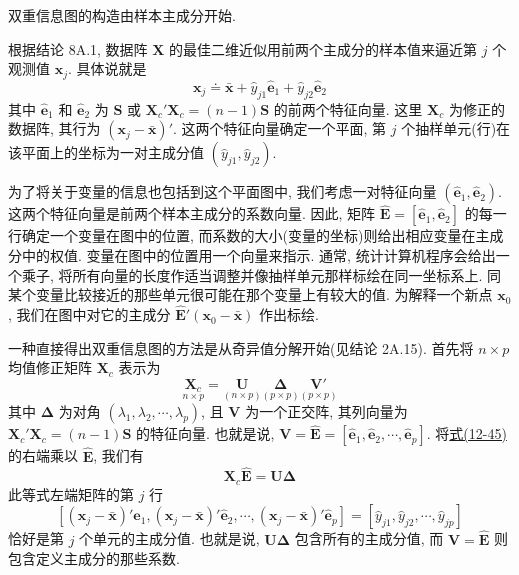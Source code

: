 

双重信息图的构造由样本主成分开始.

根据结论 8A.1, 数据阵 $\mathbf{X}$ 的最佳二维近似用前两个主成分的样本值来逼近第 $j$ 个观测值 $\mathbf{x}_j$. 具体说就是
\label{eq:12-44}
\begin{equation}
\mathbf{x}_j\doteq\bar{\mathbf{x}}+\hat{y}_{j1}\hat{\mathbf{e}}_1+\hat{y}_{j2}\hat{\mathbf{e}}_2
\tag{12-44}
\end{equation}
其中 $\hat{\mathbf{e}}_1$ 和 $\hat{\mathbf{e}}_2$ 为 $\mathbf{S}$ 或 $\mathbf{X}_c'\mathbf{X}_c=(n-1)\mathbf{S}$ 的前两个特征向量. 这里 $\mathbf{X}_c$ 为修正的数据阵, 其行为 $(\mathbf{x}_j-\bar{\mathbf{x}})'$. 这两个特征向量确定一个平面, 第 $j$ 个抽样单元(行)在该平面上的坐标为一对主成分值 $(\hat{y}_{j1},\hat{y}_{j2})$.

为了将关于变量的信息也包括到这个平面图中, 我们考虑一对特征向量 $(\hat{\mathbf{e}}_1,\hat{\mathbf{e}}_2)$. 这两个特征向量是前两个样本主成分的系数向量. 因此, 矩阵 $\hat{\mathbf{E}}=[\hat{\mathbf{e}}_1,\hat{\mathbf{e}}_2]$ 的每一行确定一个变量在图中的位置, 而系数的大小(变量的坐标)则给出相应变量在主成分中的权值. 变量在图中的位置用一个向量来指示. 通常, 统计计算机程序会给出一个乘子, 将所有向量的长度作适当调整并像抽样单元那样标绘在同一坐标系上. 同某个变量比较接近的那些单元很可能在那个变量上有较大的值. 为解释一个新点 $\mathbf{x}_0$, 我们在图中对它的主成分 $\hat{\mathbf{E}}'(\mathbf{x}_0-\bar{\mathbf{x}})$ 作出标绘.

一种直接得出双重信息图的方法是从奇异值分解开始(见结论 2A.15). 首先将 $n\times p$ 均值修正矩阵 $\mathbf{X}_c$ 表示为
\label{eq:12-45}
\begin{equation}
\underset{n\times p}{\mathbf{X}_c}=\underset{(n\times p)}{\mathbf{U}}
\underset{(p\times p)}{\boldsymbol{\Delta}}\underset{(p\times p)}{\mathbf{V}'}
\tag{12-45}
\end{equation}
其中 $\boldsymbol{\Delta}$ 为对角 $(\lambda_1,\lambda_2,\cdots,\lambda_p)$, 且 $\mathbf{V}$ 为一个正交阵, 其列向量为 $\mathbf{X}_c'\mathbf{X}_c=(n-1)\mathbf{S}$ 的特征向量. 也就是说, $\mathbf{V}=\hat{\mathbf{E}}=[\hat{\mathbf{e}}_1,\hat{\mathbf{e}}_2,\cdots,\hat{\mathbf{e}}_p]$. 将\hyperref[eq:12-45]{式(12-45)}的右端乘以 $\hat{\mathbf{E}}$, 我们有
\label{eq:12-46}
\begin{equation}
\mathbf{X}_c\hat{\mathbf{E}}=\mathbf{U}\boldsymbol{\Delta}
\tag{12-46}
\end{equation}
此等式左端矩阵的第 $j$ 行
\[
\left[(\mathbf{x}_j-\bar{\mathbf{x}})'\hat{\mathbf{e}}_1,(\mathbf{x}_j-\bar{\mathbf{x}})'\hat{\mathbf{e}}_2,\cdots,
(\mathbf{x}_j-\bar{\mathbf{x}})'\hat{\mathbf{e}}_p\right]=[\hat{y}_{j1},\hat{y}_{j2},\cdots,\hat{y}_{jp}]
\]
恰好是第 $j$ 个单元的主成分值. 也就是说, $\mathbf{U}\boldsymbol{\Delta}$ 包含所有的主成分值, 而 $\mathbf{V}=\hat{\mathbf{E}}$ 则包含定义主成分的那些系数.

